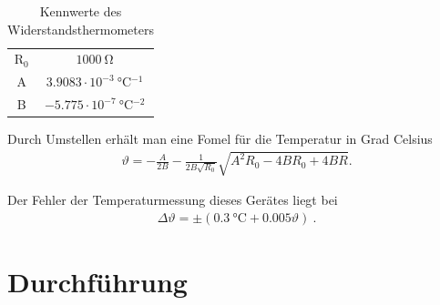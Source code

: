 \documentclass[12pt,a4paper,titlepage,headinclude,bibtotoc]{scrartcl}
\begin{document}
\begin{table}[!htb]
	\centering
	\begin{tabular}{|c|c|}
		\hline
		R$_0$ & $1000 ~ \si{\ohm}$\\
		A   & $3.9083 \cdot 10^{-3} ~ \si{\celsius^{-1}}$\\
		B   & $-5.775 \cdot 10^{-7} ~ \si{\celsius^{-2}}$\\
		\hline
	\end{tabular}
	\caption{Kennwerte des Widerstandsthermometers}
	\label{tab:Pt1000}
\end{table}

Durch Umstellen erhält man eine Fomel für die Temperatur in Grad Celsius
\begin{align}
 \vartheta = -\frac{A}{2 B} - \frac{1}{2 B \sqrt{R_0}} \sqrt{A^2 R_0  - 4 B R_0 + 4 B R    }\label{eq:temperapt1000} .
\end{align}

Der Fehler der Temperaturmessung dieses Gerätes liegt bei
\begin{align}
	\Delta\vartheta=\pm (0.3~\si{\celsius}+0.005\vartheta)~.
	\label{eq:Pt1000_fehler}
\end{align}


\section{Durchführung}
\label{sec:durchfuehrung}
\end{document}
